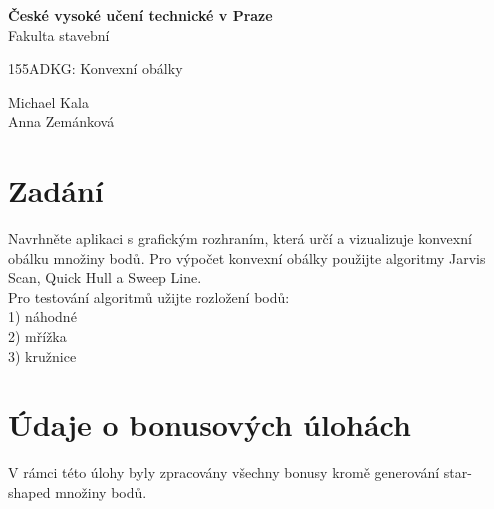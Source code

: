 \documentclass[a4paper, 12pt]{article}
\begin{document}
\begin{titlepage}
\begin{center}
\noindent
\Large \textbf{České vysoké učení technické v Praze }\\ Fakulta stavební
\vspace{5cm}

\huge


\vspace{0.5cm}

155ADKG: Konvexní obálky \\

\vspace{10cm}




\Large
Michael Kala\\
Anna Zemánková \\

\end{center}

\end{titlepage}




\pagestyle{plain}     %
\setcounter{page}{1}  %


\section{Zadání}
Navrhněte aplikaci s grafickým rozhraním, která určí a vizualizuje konvexní obálku množiny bodů.
Pro výpočet konvexní obálky použijte algoritmy Jarvis Scan, Quick Hull a Sweep Line.\\

Pro testování algoritmů užijte rozložení bodů: \\
1) náhodné\\
2) mřížka\\
3) kružnice\\ 

\vspace{5cm}

\section{Údaje o bonusových úlohách}
V rámci této úlohy byly zpracovány všechny bonusy kromě generování star-shaped množiny bodů.\\
\end{document}
